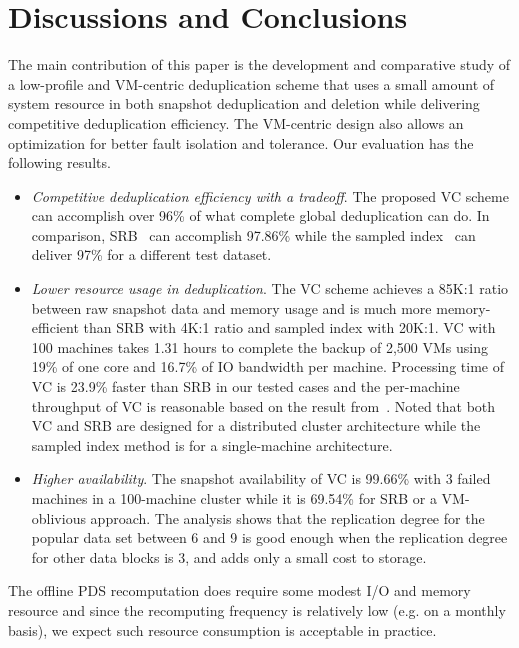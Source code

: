 \section{Discussions and Conclusions}
\label{sect:conclusion}
The main contribution of this paper is the development and comparative study of a low-profile and VM-centric deduplication scheme that
uses  a small amount of system resource in both snapshot deduplication and deletion
while delivering competitive deduplication efficiency.
The VM-centric design also allows an optimization for  better fault isolation and tolerance.
Our evaluation has the following results.
\begin{itemize}
\item {\em Competitive deduplication efficiency with a tradeoff}. 
The proposed VC scheme 
can accomplish over  96\% of what complete global
deduplication can do. In comparison, SRB~\cite{Dong2011,extreme_binning09}
can accomplish 97.86\% while 
the sampled index~\cite{Guo2011} can deliver 97\% for a different test dataset. 
\item {\em Lower resource usage in deduplication}. 
The VC scheme achieves a 85K:1 ratio between raw snapshot data and memory usage
and is much more memory-efficient than 
SRB  with 4K:1 ratio and sampled index with 20K:1.
VC with 100 machines takes 1.31 hours to complete the backup of 2,500 VMs
using 19\% of one core and 16.7\% of IO bandwidth per machine. 
Processing time of VC is 23.9\% faster  than SRB in our tested cases
and the per-machine throughput of VC is reasonable based on the result 
from~\cite{Guo2011}. 
Noted that both VC and SRB are designed for a distributed cluster architecture while
the sampled index method is for a single-machine architecture.
\item {\em Higher availability}. 
The snapshot availability of VC is 99.66\% with 3 failed machines in a 100-machine cluster
while it is 69.54\% for  SRB or a VM-oblivious approach.
The analysis shows that the replication degree
for the popular data set between 6 and 9 is good enough when the replication degree
for other data blocks is 3, and adds only a small cost to storage.
\end{itemize}
The offline PDS recomputation does require some modest I/O and memory resource and 
since the recomputing frequency is relatively low (e.g. on a monthly basis), we expect such resource
consumption is acceptable in practice.

